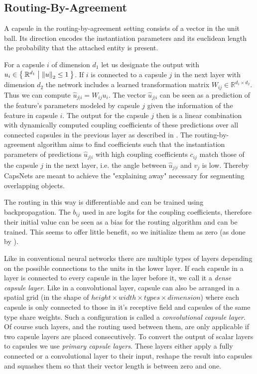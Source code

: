 \subsection{Routing-By-Agreement}

\newcommand{\uhat}{\hat{u}_{j \vert i}}

A capsule in the routing-by-agreement setting consists of a vector in the unit ball.
Its direction encodes the instantiation parameters and its euclidean length the probability that the attached entity is present.

For a capsule $i$ of dimension $d_1$ let us designate the output with $u_i \in \Set{ \mathbb{R}^{d_1} | \left \lVert u \right \rVert _{2} \leq 1}$.
If $i$ is connected to a capsule $j$ in the next layer with dimension $d_2$ the network includes a learned transformation matrix $W_{ij} \in \mathbb{R}^{d_1 \times d_2}$.
Thus we can compute $\uhat = W_{ij} u_i$.
The vector $\uhat$ can be seen as a prediction of the feature's parameters modeled by capsule $j$ given the information of the feature in capsule $i$.
The output for the capsule $j$ then is a linear combination with dynamically computed coupling coefficients of these predictions over all connected capsules in the previous layer as described in .
The routing-by-agreement algorithm aims to find coefficients such that the instantiation parameters of predictions $\uhat$ with high coupling coefficients $c_{ij}$ match those of the capsule $j$ in the next layer, i.e. the angle between $\uhat$ and $v_j$ is low.
Thereby CapsNets are meant to achieve the "explaining away" necessary for segmenting overlapping objects.

The routing in this way is differentiable and can be trained using backpropagation.
The $b_{ij}$ used in  are logits for the coupling coefficients, therefore their initial value can be seen as a bias for the routing algorithm and can be trained.
This seems to offer little benefit, so we initialize them as zero (as done by \cite{capsules}).

Like in conventional neural networks there are multiple types of layers depending on the possible connections to the units in the lower layer.
If each capsule in a layer is connected to every capsule in the layer before it, we call it a \emph{dense capsule layer}.
Like in a convolutional layer, capsule can also be arranged in a spatial grid (in the shape of $height \times width \times types \times dimension$) where each capsule is only connected to those in it's receptive field and capsules of the same type share weights.
Such a configuration is called a \emph{convolutional capsule layer}.
Of course such layers, and the routing used between them, are only applicable if two capsule layers are placed consecutively.
To convert the output of scalar layers to capsules we use \emph{primary capsule layers}.
These layers either apply a fully connected or a convolutional layer to their input, reshape the result into capsules and squashes them so that their vector length is between zero and one.

